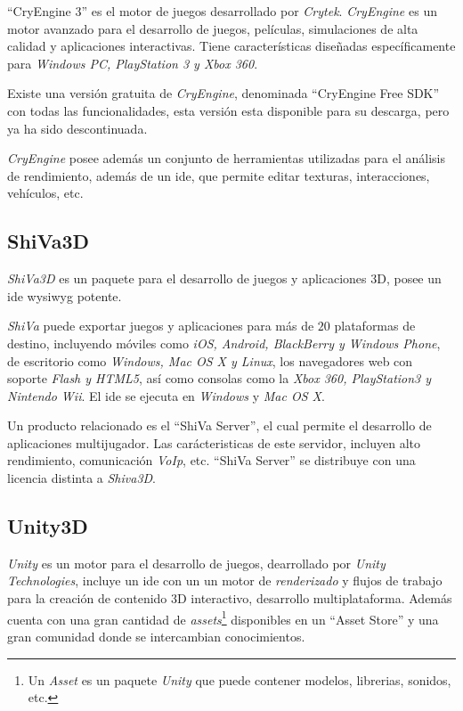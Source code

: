 \enquote{CryEngine 3} es el motor de juegos desarrollado por \textit{Crytek}.
\textit{CryEngine} es un motor avanzado para el desarrollo de juegos, películas,
simulaciones de alta calidad y aplicaciones interactivas. Tiene características
diseñadas específicamente para \textit{Windows PC, PlayStation 3 y Xbox
    360}\cite{cryengine}.

Existe una versión gratuita de \textit{CryEngine}, denominada \enquote{CryEngine
    Free SDK} con todas las funcionalidades, esta versión esta disponible para
su descarga, pero ya ha sido descontinuada\cite{cryengine:sdk}.

\textit{CryEngine} posee además un conjunto de herramientas utilizadas para el
análisis de rendimiento\cite{cryengine}, además de un \Gls{ide}, que permite
editar texturas, interacciones, vehículos, etc.

\subsection{ShiVa3D}

\textit{ShiVa3D} es un paquete para el desarrollo de juegos y aplicaciones 3D,
posee un \Gls{ide} \Gls{wysiwyg} potente\cite{shiva}.

\textit{ShiVa} puede exportar juegos y aplicaciones para más de $20$ plataformas
de destino, incluyendo móviles como \textit{iOS, Android, BlackBerry y Windows
    Phone}, de escritorio como \textit{Windows, Mac OS X y Linux}, los
navegadores web con soporte \textit{Flash y HTML5}, así como consolas como la
\textit{Xbox 360, PlayStation3 y Nintendo Wii}. El \Gls{ide} se ejecuta en
\textit{Windows} y \textit{Mac OS X}\cite{shiva}. 

Un producto relacionado es el \enquote{ShiVa Server}, el cual permite el
desarrollo de aplicaciones multijugador. Las carácteristicas de este servidor,
incluyen alto rendimiento, comunicación \textit{VoIp}, etc. \enquote{ShiVa
    Server} se distribuye con una licencia distinta a
\textit{Shiva3D}\cite{shiva}.

\subsection{Unity3D}

\textit{Unity}\cite{unity3d} es un motor para el desarrollo de juegos,
dearrollado por \textit{Unity Technologies}, incluye un \Gls{ide} con un un
motor de \textit{renderizado} y flujos de trabajo para la creación de contenido
3D interactivo, desarrollo multiplataforma. Además cuenta con una gran cantidad
de \textit{assets}\footnote{Un \textit{Asset} es un paquete \textit{Unity} que
    puede contener modelos, librerias, sonidos, etc.} disponibles en un
\enquote{Asset Store} y una gran comunidad donde se intercambian conocimientos.

